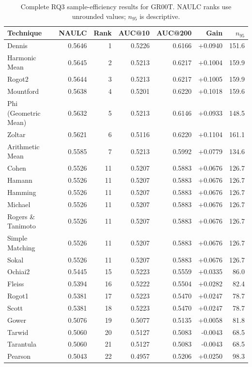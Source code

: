 \begin{table}[t]
\centering
\caption{Complete RQ3 sample-efficiency results for GR00T. NAULC ranks use unrounded values; $n_{95}$ is descriptive.}
\label{tab:rq3v2-efficiency-gr00t}
{\scriptsize
\setlength{\tabcolsep}{6pt}
\begin{tabular}{lrrrrrr}
\toprule
Technique & NAULC & Rank & AUC@10 & AUC@200 & Gain & $n_{95}$ \\
\midrule
Dennis & 0.5646 & 1 & 0.5226 & 0.6166 & +0.0940 & 151.6 \\
Harmonic Mean & 0.5645 & 2 & 0.5213 & 0.6217 & +0.1004 & 159.9 \\
Rogot2 & 0.5644 & 3 & 0.5213 & 0.6217 & +0.1005 & 159.9 \\
Mountford & 0.5638 & 4 & 0.5201 & 0.6220 & +0.1018 & 159.6 \\
Phi (Geometric Mean) & 0.5632 & 5 & 0.5213 & 0.6146 & +0.0933 & 148.5 \\
Zoltar & 0.5621 & 6 & 0.5116 & 0.6220 & +0.1104 & 161.1 \\
Arithmetic Mean & 0.5585 & 7 & 0.5213 & 0.5992 & +0.0779 & 134.6 \\
Cohen & 0.5526 & 11 & 0.5207 & 0.5883 & +0.0676 & 126.7 \\
Hamann & 0.5526 & 11 & 0.5207 & 0.5883 & +0.0676 & 126.7 \\
Hamming & 0.5526 & 11 & 0.5207 & 0.5883 & +0.0676 & 126.7 \\
Michael & 0.5526 & 11 & 0.5207 & 0.5883 & +0.0676 & 126.7 \\
Rogers \& Tanimoto & 0.5526 & 11 & 0.5207 & 0.5883 & +0.0676 & 126.7 \\
Simple Matching & 0.5526 & 11 & 0.5207 & 0.5883 & +0.0676 & 126.7 \\
Sokal & 0.5526 & 11 & 0.5207 & 0.5883 & +0.0676 & 126.7 \\
Ochiai2 & 0.5445 & 15 & 0.5223 & 0.5559 & +0.0335 & 86.0 \\
Fleiss & 0.5394 & 16 & 0.5222 & 0.5504 & +0.0282 & 82.4 \\
Rogot1 & 0.5381 & 17 & 0.5223 & 0.5470 & +0.0247 & 78.7 \\
Scott & 0.5381 & 18 & 0.5223 & 0.5470 & +0.0247 & 78.7 \\
Gower & 0.5076 & 19 & 0.5077 & 0.5135 & +0.0058 & 81.8 \\
Tarwid & 0.5060 & 20 & 0.5127 & 0.5083 & -0.0043 & 68.5 \\
Tarantula & 0.5060 & 21 & 0.5127 & 0.5083 & -0.0043 & 68.5 \\
Pearson & 0.5043 & 22 & 0.4957 & 0.5206 & +0.0250 & 98.3 \\

\end{tabular}}
\end{table}
